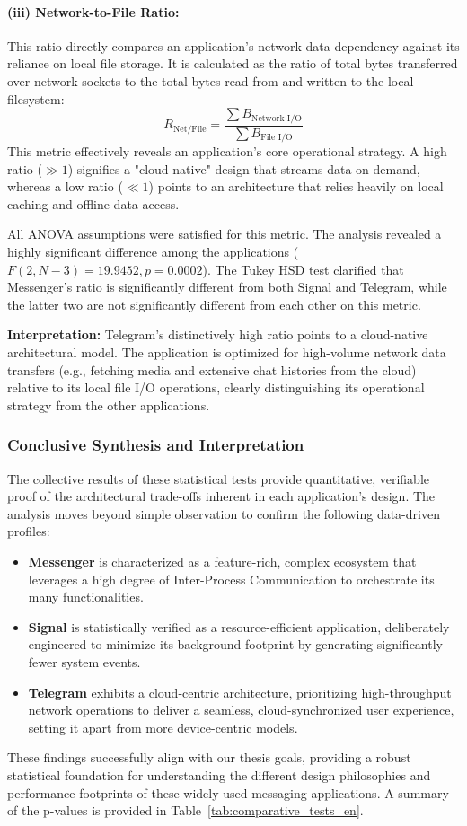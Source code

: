 \documentclass[a4paper,12pt]{report}
\begin{document}
\paragraph{(iii) Network-to-File Ratio:}
This ratio directly compares an application's network data dependency against its reliance on local file storage. It is calculated as the ratio of total bytes transferred over network sockets to the total bytes read from and written to the local filesystem:
$$R_{\text{Net/File}} = \frac{\sum B_{\text{Network I/O}}}{\sum B_{\text{File I/O}}}$$
This metric effectively reveals an application's core operational strategy. A high ratio ($\gg 1$) signifies a "cloud-native" design that streams data on-demand, whereas a low ratio ($\ll 1$) points to an architecture that relies heavily on local caching and offline data access.

All ANOVA assumptions were satisfied for this metric. The analysis revealed a highly significant difference among the applications ($F(2, N-3) = 19.9452, p = 0.0002$). The Tukey HSD test clarified that Messenger's ratio is significantly different from both Signal and Telegram, while the latter two are not significantly different from each other on this metric.

\textbf{Interpretation:} Telegram's distinctively high ratio points to a cloud-native architectural model. The application is optimized for high-volume network data transfers (e.g., fetching media and extensive chat histories from the cloud) relative to its local file I/O operations, clearly distinguishing its operational strategy from the other applications.

\subsubsection{Conclusive Synthesis and Interpretation}

The collective results of these statistical tests provide quantitative, verifiable proof of the architectural trade-offs inherent in each application's design. The analysis moves beyond simple observation to confirm the following data-driven profiles:
\begin{itemize}
    \item \textbf{Messenger} is characterized as a feature-rich, complex ecosystem that leverages a high degree of Inter-Process Communication to orchestrate its many functionalities.
    \item \textbf{Signal} is statistically verified as a resource-efficient application, deliberately engineered to minimize its background footprint by generating significantly fewer system events.
    \item \textbf{Telegram} exhibits a cloud-centric architecture, prioritizing high-throughput network operations to deliver a seamless, cloud-synchronized user experience, setting it apart from more device-centric models.
\end{itemize}
These findings successfully align with our thesis goals, providing a robust statistical foundation for understanding the different design philosophies and performance footprints of these widely-used messaging applications. A summary of the p-values is provided in Table~\ref{tab:comparative_tests_en}.
\end{document}
